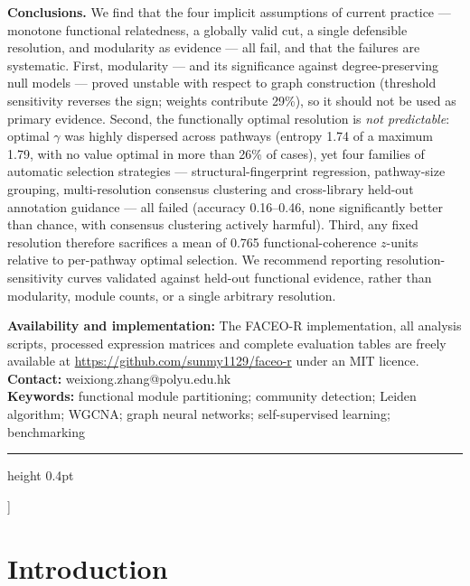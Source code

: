 \documentclass[twocolumn,10pt,letterpaper]{article}
\begin{document}
{\begin{minipage}{1.0\textwidth}
\vspace{4pt}
\noindent\textbf{Conclusions.} We find that the four implicit assumptions of current
practice --- monotone functional relatedness, a globally valid cut, a single defensible
resolution, and modularity as evidence --- all fail, and that the failures are systematic. First,
modularity --- and its significance against degree-preserving null models --- proved unstable
with respect to graph construction (threshold sensitivity reverses the sign; weights
contribute 29\%), so it should not be used as primary evidence. Second, the functionally optimal
resolution is \emph{not predictable}: optimal $\gamma$ was highly dispersed across pathways
(entropy 1.74 of a maximum 1.79, with no value optimal in more than 26\% of cases), yet four
families of automatic selection strategies --- structural-fingerprint regression, pathway-size
grouping, multi-resolution consensus clustering and cross-library held-out annotation
guidance --- all failed (accuracy 0.16--0.46, none significantly better than chance, with
consensus clustering actively harmful). Third, any fixed resolution therefore sacrifices a
mean of 0.765 functional-coherence $z$-units relative to per-pathway optimal selection. We
recommend reporting resolution-sensitivity curves validated against held-out functional
evidence, rather than modularity, module counts, or a single arbitrary resolution.

\vspace{6pt}
\noindent\textbf{Availability and implementation:} The FACEO-R implementation, all
analysis scripts, processed expression matrices and complete evaluation tables are freely
available at \url{https://github.com/sunmy1129/faceo-r} under an MIT licence.\\
\noindent\textbf{Contact:} weixiong.zhang@polyu.edu.hk\\
\noindent\textbf{Keywords:} functional module partitioning; community detection; Leiden
algorithm; WGCNA; graph neural networks; self-supervised learning; benchmarking
\end{minipage}
\vspace{0.30em}
\hrule height 0.4pt
\vspace{0.85em}
}]

\clearpage

\vspace{2pt}

\section{Introduction}
\end{document}
